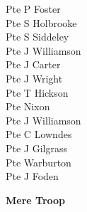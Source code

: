 \begin{multicols}{2}
  Pte P Foster \\
  Pte S Holbrooke \\
  Pte S Siddeley \\
  Pte J Williamson \\
  Pte J Carter \\
  Pte J Wright \\
  Pte T Hickson \\
  Pte Nixon \\
  Pte J Williamson \\
  Pte C Lowndes \\
  Pte J Gilgrass \\
  Pte Warburton \\
  Pte J Foden \\
\end{multicols}

\begin{center}
  \Large
  \textbf{Mere Troop}
\end{center}

